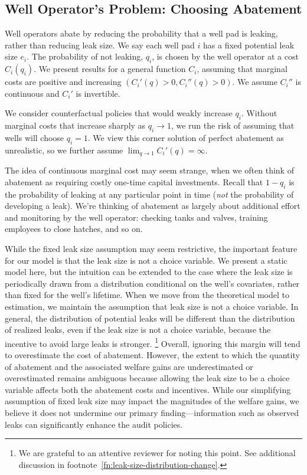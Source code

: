 \subsection{Well Operator's Problem: Choosing Abatement}
\label{sec:well-operator-problem-choosing-abatement}

\noindent
Well operators abate by reducing the probability that a well pad is leaking, rather than reducing leak size.
We say each well pad \(i\) has a fixed potential leak size \(e_i\).
The probability of not leaking, \(q_i\), is chosen by the well operator at a cost \(C_i(q_i)\).
We present results for a general function \(C_i\), assuming that marginal costs are positive and increasing \((C_i'(q) > 0, C_i''(q) > 0)\).
We assume \(C_i''\) is continuous and \(C_i'\) is invertible.

We consider counterfactual policies that would weakly increase \(q_i\).
Without marginal costs that increase sharply as \(q_i \to \text{1}\), we run the risk of assuming that wells will choose \(q_i = \text{1}\).
We view this corner solution of perfect abatement as unrealistic, so we
further assume
\(\lim_{q \to 1} C_i'(q) = \infty\).

The idea of continuous marginal cost may seem strange, when we often think of abatement as requiring costly one-time capital investments.
Recall that \(1 - q_i\) is the probability of leaking at any particular point in time (\emph{not} the probability of developing a leak).
We're thinking of abatement as largely about additional effort and monitoring by the well operator: checking tanks and valves, training employees to close hatches, and so on.

While the fixed leak size assumption may seem restrictive, the important feature for our model is that the leak size is not a choice variable.
We present a static model here, but the intuition can be extended to the case where the leak size is periodically drawn from a distribution conditional on the well's covariates, rather than fixed for the well's lifetime.
When we move from the theoretical model to estimation, we maintain the assumption that leak size is not a choice variable.
In general, the distribution of potential leaks will be different than the distribution of realized leaks, even if the leak size is not a choice variable, because the incentive to avoid large leaks is stronger.%
\footnote{We are grateful to an attentive reviewer for noting this point.
See additional discussion in footnote~\ref{fn:leak-size-distribution-change}.}
Overall, ignoring this margin will tend to overestimate the cost of abatement. However, the extent to which the quantity of abatement and the associated welfare gains are underestimated or overestimated remains ambiguous because allowing the leak size to be a choice variable affects both the abatement costs and incentives.
While our simplifying assumption of fixed leak size may impact the magnitudes of the welfare gains, we believe it does not undermine our primary finding---information such as observed leaks can significantly enhance the audit policies.

